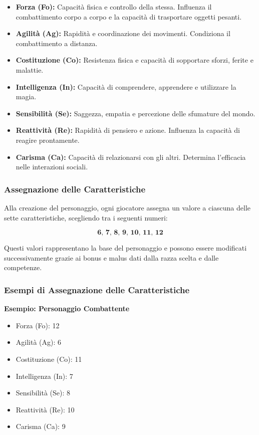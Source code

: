 \documentclass[../manuale_main.tex]{subfiles}
\begin{document}
\begin{itemize}
    \item \textbf{Forza (Fo):} Capacità fisica e controllo della stessa. Influenza il combattimento corpo a corpo e la capacità di trasportare oggetti pesanti.
    \item \textbf{Agilità (Ag):} Rapidità e coordinazione dei movimenti. Condiziona il combattimento a distanza.
    \item \textbf{Costituzione (Co):} Resistenza fisica e capacità di sopportare sforzi, ferite e malattie.
    \item \textbf{Intelligenza (In):} Capacità di comprendere, apprendere e utilizzare la magia.
    \item \textbf{Sensibilità (Se):} Saggezza, empatia e percezione delle sfumature del mondo.
    \item \textbf{Reattività (Re):} Rapidità di pensiero e azione. Influenza la capacità di reagire prontamente.
    \item \textbf{Carisma (Ca):} Capacità di relazionarsi con gli altri. Determina l’efficacia nelle interazioni sociali.
\end{itemize}

\subsubsection{Assegnazione delle Caratteristiche}
Alla creazione del personaggio, ogni giocatore assegna un valore a ciascuna delle sette caratteristiche, scegliendo tra i seguenti numeri:

\[
\textbf{6, 7, 8, 9, 10, 11, 12}
\]

Questi valori rappresentano la base del personaggio e possono essere modificati successivamente grazie ai bonus e malus dati dalla razza scelta e dalle competenze.

\vspace{0.3cm}

\subsubsection{Esempi di Assegnazione delle Caratteristiche}
\textbf{Esempio: Personaggio Combattente}
\begin{itemize}
    \item Forza (Fo): 12
    \item Agilità (Ag): 6
    \item Costituzione (Co): 11
    \item Intelligenza (In): 7
    \item Sensibilità (Se): 8
    \item Reattività (Re): 10
    \item Carisma (Ca): 9
\end{itemize}
\end{document}
